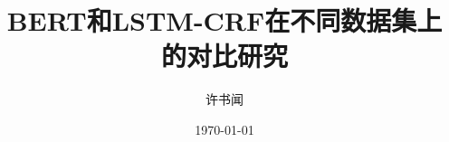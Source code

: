 \documentclass{article}
\begin{document}
\title{\Large{BERT和LSTM-CRF在不同数据集上的对比研究}}
\author{许书闻}
\date{\today}

\maketitle

\begin{abstract}



\end{abstract}

\tableofcontents
\newpage
\end{document}
